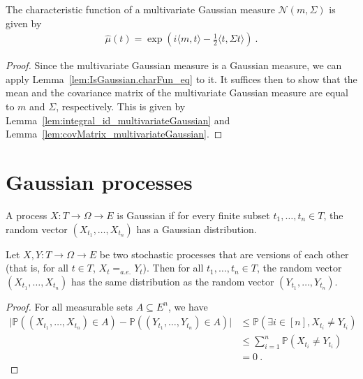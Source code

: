 \begin{theorem}\label{thm:charFun_multivariateGaussian}
The characteristic function of a multivariate Gaussian measure $\mathcal{N}(m, \Sigma)$ is given by
\begin{align*}
  \hat{\mu}(t) = \exp\left(i \langle m, t \rangle - \frac{1}{2} \langle t, \Sigma t \rangle\right)
  \: .
\end{align*}
\end{theorem}

\begin{proof}
Since the multivariate Gaussian measure is a Gaussian measure, we can apply Lemma~\ref{lem:IsGaussian.charFun_eq} to it.
It suffices then to show that the mean and the covariance matrix of the multivariate Gaussian measure are equal to $m$ and $\Sigma$, respectively.
This is given by Lemma~\ref{lem:integral_id_multivariateGaussian} and Lemma~\ref{lem:covMatrix_multivariateGaussian}.
\end{proof}


\section{Gaussian processes}
\label{sec:gaussian_processes}

\begin{definition}\label{def:IsGaussianProcess}
  \leanok
A process $X : T \to \Omega \to E$ is Gaussian if for every finite subset $t_1, \ldots, t_n \in T$, the random vector $(X_{t_1}, \ldots, X_{t_n})$ has a Gaussian distribution.
\end{definition}


\begin{lemma}\label{lem:map_eq_of_version}
Let $X, Y : T \to \Omega \to E$ be two stochastic processes that are versions of each other (that is, for all $t \in T$, $X_t =_{a.e.} Y_t$).
Then for all $t_1, \ldots, t_n \in T$, the random vector $(X_{t_1}, \ldots, X_{t_n})$ has the same distribution as the random vector $(Y_{t_1}, \ldots, Y_{t_n})$.
\end{lemma}

\begin{proof}
For all measurable sets $A \subseteq E^n$, we have
\begin{align*}
  \vert \mathbb{P}((X_{t_1}, \ldots, X_{t_n}) \in A) - \mathbb{P}((Y_{t_1}, \ldots, Y_{t_n}) \in A) \vert
  &\le \mathbb{P}(\exists i \in [n], X_{t_i} \ne Y_{t_i})
  \\
  &\le \sum_{i=1}^n \mathbb{P}(X_{t_i} \ne Y_{t_i})
  \\
  &= 0
  \: .
\end{align*}
\end{proof}



